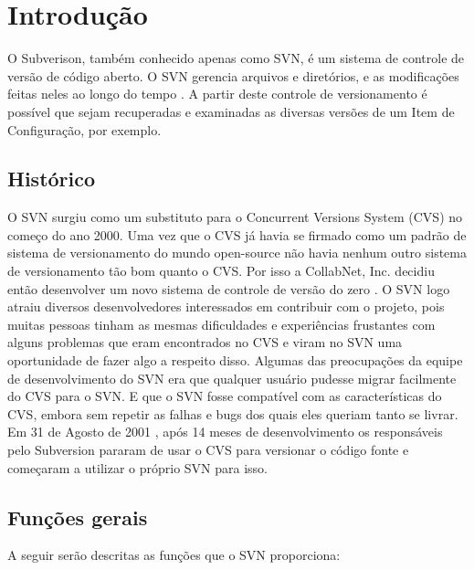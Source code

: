 \chapter[Introdução]{Introdução}

  O Subverison, também conhecido apenas como SVN, é um sistema de controle de versão de código aberto. O SVN gerencia arquivos e diretórios, e as modificações feitas neles ao longo do tempo \cite{svn-book}.
  A partir deste controle de versionamento é possível que sejam recuperadas e examinadas as diversas versões de um Item de Configuração, por exemplo.

\section{Histórico}

  O SVN surgiu como um substituto para o Concurrent Versions System (CVS) \cite{cvs-book} no começo do ano 2000. Uma vez que o CVS já havia se firmado como um padrão de sistema de versionamento do mundo open-source não havia nenhum outro sistema de versionamento tão bom quanto o CVS. Por isso a CollabNet, Inc. decidiu então desenvolver um novo sistema de controle de versão do zero \cite{svn-book}.
  O SVN logo atraiu diversos desenvolvedores interessados em contribuir com o projeto, pois muitas pessoas tinham as mesmas dificuldades e experiências frustantes com alguns problemas que eram encontrados no CVS e viram no SVN uma oportunidade de fazer algo a respeito disso.
  Algumas das preocupações da equipe de desenvolvimento do SVN era que qualquer usuário pudesse migrar facilmente do CVS para o SVN. E que o SVN fosse compatível com as características do CVS, embora sem repetir as falhas e bugs dos quais eles queriam tanto se livrar.
  Em 31 de Agosto de 2001 \cite{svn-book}, após 14 meses de desenvolvimento os responsáveis pelo Subversion pararam de usar o CVS para versionar o código fonte e começaram a utilizar o próprio SVN para isso.

\section{Funções gerais}

  A seguir serão descritas as funções que o SVN proporciona:

